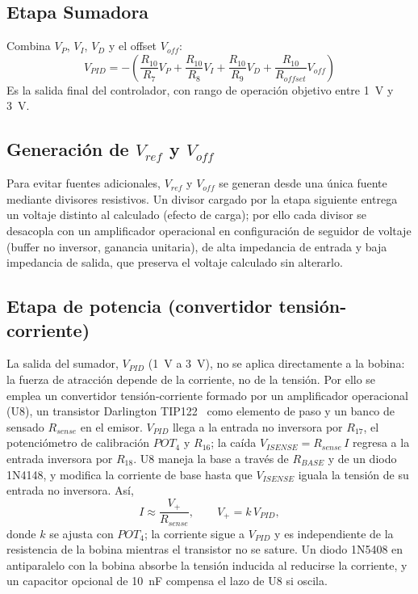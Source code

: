\documentclass[conference]{IEEEtran}
\begin{document}
\subsection{Etapa Sumadora}
Combina $V_P$, $V_I$, $V_D$ y el offset $V_{off}$:
\begin{equation}
V_{PID} = -\left(\frac{R_{10}}{R_7}V_P+\frac{R_{10}}{R_8}V_I+\frac{R_{10}}{R_{9}}V_D+\frac{R_{10}}{R_{offset}}V_{off}\right)
\label{eq:sum}
\end{equation}
Es la salida final del controlador, con rango de operación objetivo entre 1~V y 3~V.

\subsection{Generación de \texorpdfstring{$V_{ref}$}{Vref} y \texorpdfstring{$V_{off}$}{Voff}}
Para evitar fuentes adicionales, $V_{ref}$ y $V_{off}$ se generan desde una única fuente mediante divisores resistivos. Un divisor cargado por la etapa siguiente entrega un voltaje distinto al calculado (efecto de carga); por ello cada divisor se desacopla con un amplificador operacional en configuración de seguidor de voltaje (buffer no inversor, ganancia unitaria), de alta impedancia de entrada y baja impedancia de salida, que preserva el voltaje calculado sin alterarlo.

\subsection{Etapa de potencia (convertidor tensión-corriente)}
La salida del sumador, $V_{PID}$ (1~V a 3~V), no se aplica directamente a la bobina: la fuerza de atracción depende de la corriente, no de la tensión. Por ello se emplea un convertidor tensión-corriente formado por un amplificador operacional (U8), un transistor Darlington TIP122~\cite{tip122} como elemento de paso y un banco de sensado $R_{sense}$ en el emisor. $V_{PID}$ llega a la entrada no inversora por $R_{17}$, el potenciómetro de calibración $POT_4$ y $R_{16}$; la caída $V_{ISENSE}=R_{sense}\,I$ regresa a la entrada inversora por $R_{18}$. U8 maneja la base a través de $R_{BASE}$ y de un diodo 1N4148, y modifica la corriente de base hasta que $V_{ISENSE}$ iguala la tensión de su entrada no inversora. Así,
\begin{equation}
I \approx \frac{V_{+}}{R_{sense}},\qquad V_{+}=k\,V_{PID},
\label{eq:potencia}
\end{equation}
donde $k$ se ajusta con $POT_4$; la corriente sigue a $V_{PID}$ y es independiente de la resistencia de la bobina mientras el transistor no se sature. Un diodo 1N5408 en antiparalelo con la bobina absorbe la tensión inducida al reducirse la corriente, y un capacitor opcional de 10~nF compensa el lazo de U8 si oscila.
\end{document}
